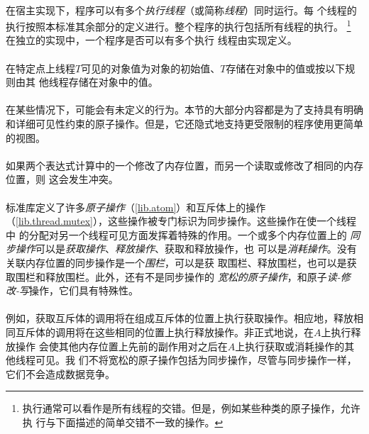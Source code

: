 \paragraph{}
在宿主实现下，程序可以有多个\textit{执行线程}（或简称\textit{线程}）同时运行。每
个线程的执行按照本标准其余部分的定义进行。整个程序的执行包括所有线程的执行。
\footnote{执行通常可以看作是所有线程的交错。但是，例如某些种类的原子操作，允许执
行与下面描述的简单交错不一致的操作。} 在独立的实现中，一个程序是否可以有多个执行
线程由实现定义。

\paragraph{}
在特定点上线程$T$可见的对象值为对象的初始值、$T$存储在对象中的值或按以下规则由其
他线程存储在对象中的值。

\paragraph{}
\notes 在某些情况下，可能会有未定义的行为。本节的大部分内容都是为了支持具有明确
和详细可见性约束的原子操作。但是，它还隐式地支持更受限制的程序使用更简单的视图。

\paragraph{}
如果两个表达式计算中的一个修改了内存位置，而另一个读取或修改了相同的内存位置，则
这会发生冲突。

\paragraph{}
标准库定义了许多\textit{原子操作}（\ref{lib.atom}）和互斥体上的操作
（\ref{lib.thread.mutex}），这些操作被专门标识为同步操作。这些操作在使一个线程中
的分配对另一个线程可见方面发挥着特殊的作用。一个或多个内存位置上的
\textit{同步操作}可以是\textit{获取操作}、\textit{释放操作}、获取和释放操作，也
可以是\textit{消耗操作}。没有关联内存位置的同步操作是一个\textit{围栏}，可以是获
取围栏、释放围栏，也可以是获取围栏和释放围栏。此外，还有不是同步操作的
\textit{宽松的原子操作}，和原子\textit{读-修改-写}操作，它们具有特殊性。

\paragraph{}
\notes 例如，获取互斥体的调用将在组成互斥体的位置上执行获取操作。相应地，释放相
同互斥体的调用将在这些相同的位置上执行释放操作。非正式地说，在$A$上执行释放操作
会使其他内存位置上先前的副作用对之后在$A$上执行获取或消耗操作的其他线程可见。我
们不将宽松的原子操作包括为同步操作，尽管与同步操作一样，它们不会造成数据竞争。

